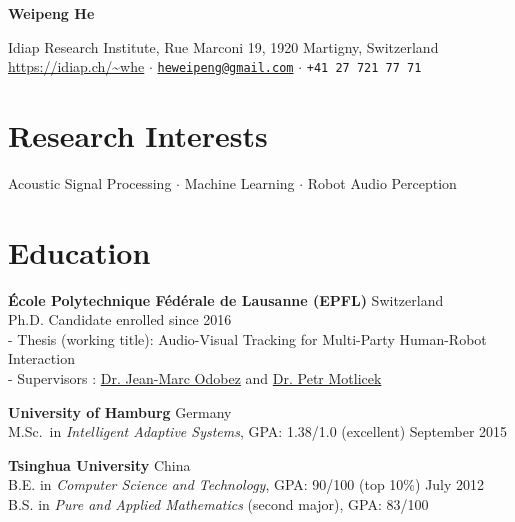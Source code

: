 \documentclass[a4paper,11pt]{article} %
\newcommand{\ind}{\hspace*{1em}}
\begin{document}
\thispagestyle{empty}


\begin{center}
  {\Huge\bfseries\sffamily Weipeng He}

  \sffamily Idiap Research Institute, Rue Marconi 19, 1920 Martigny, Switzerland \\
  \url{https://idiap.ch/~whe} $\cdotp$
  \href{mailto:heweipeng@gmail.com}{\texttt{heweipeng@gmail.com}} $\cdotp$
  \texttt{+41 27 721 77 71}
\end{center}


\section{Research Interests}
\begin{center}
Acoustic Signal Processing $\cdotp$ Machine Learning $\cdotp$ Robot Audio Perception
\end{center}


\section{Education}
\textbf{\'Ecole Polytechnique F\'ed\'erale de Lausanne (EPFL)} \hfill Switzerland \\
\ind Ph.D. Candidate \hfill enrolled since 2016 \\
\ind - Thesis (working title): Audio-Visual Tracking for Multi-Party Human-Robot Interaction \\
\ind - Supervisors : \href{https://idiap.ch/~odobez}{Dr. Jean-Marc Odobez} and \href{https://people.idiap.ch/pmotlic}{Dr. Petr Motlicek}

\textbf{University of Hamburg} \hfill Germany \\
\ind M.Sc.\ in \textit{Intelligent Adaptive Systems}, GPA\@: 1.38/1.0 (excellent)  \hfill September 2015

\textbf{Tsinghua University} \hfill China \\
\ind B.E. in \textit{Computer Science and Technology}, GPA\@: 90/100 (top 10\%) \hfill July 2012 \\
\ind B.S. in \textit{Pure and Applied Mathematics} (second major), GPA\@: 83/100 %
\end{document}
